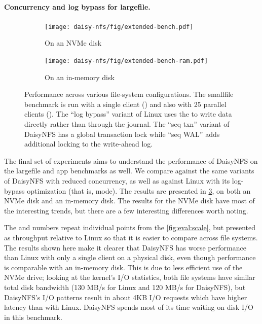\paragraph{Concurrency and log bypass for largefile.}

\begin{figure}[hp]
  \begin{subfigure}[b]{\textwidth}
    \texttt{[image: daisy-nfs/fig/extended-bench.pdf]}
    \caption{On an NVMe disk}
    \label{fig:bench-configs:nvme}
  \end{subfigure}

  \begin{subfigure}[b]{\textwidth}
    \texttt{[image: daisy-nfs/fig/extended-bench-ram.pdf]}
    \caption{On an in-memory disk}
    \label{fig:bench-configs:ram}
  \end{subfigure}
  \vspace{0.5\baselineskip}
  \caption[Benchmarks across file-system configurations]%
  {Performance across various file-system configurations. The smallfile
    benchmark is run with a single client () and also with 25
    parallel clients (). The ``log bypass'' variant of Linux
    uses the  to write data directly rather than through the
    journal. The ``seq txn'' variant of DaisyNFS has a global transaction lock
    while ``seq WAL'' adds additional locking to the write-ahead log.}
  \label{fig:bench-configs}
\end{figure}

The final set of experiments aims to understand the performance of DaisyNFS on
the largefile and app benchmarks as well. We compare against the same variants
of DaisyNFS with reduced concurrency, as well as against Linux with its
log-bypass optimization (that is,  mode).
The results are presented in \cref{fig:bench-configs},
on both an NVMe disk and an in-memory disk. The results for the NVMe disk have
most of the interesting trends, but there are a few interesting differences
worth noting.

The  and  numbers repeat individual points from
the \cref{fig:eval:scale}, but presented as throughput relative to Linux so that
it is easier to compare across file systems. The  results shown
here make it clearer that DaisyNFS has worse performance than Linux with
only a single client on a physical disk, even though performance is comparable with an in-memory disk. This is due to less efficient use of
the NVMe drive; looking at the kernel's I/O statistics, both file systems have
similar total disk bandwidth (130 MB/s for Linux and 120 MB/s for DaisyNFS), but
DaisyNFS's I/O patterns result in about 4KB I/O requests which have higher
latency than with Linux. DaisyNFS spends most of its time waiting on disk I/O in
this benchmark. 

